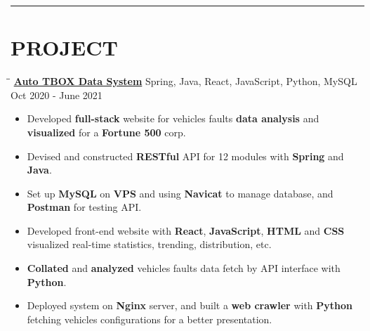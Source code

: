 \documentclass{res}
\begin{document}
\begin{resume}
\vspace{+0.05in}

\vspace{-8pt}
\hspace{-0.55in}
\noindent\rule[0.25\baselineskip]{19.36cm}{0.5pt}    
        
\vspace{-0.2in}
\section{PROJECT}

    \vspace{-0.05in}	 
    \begin{tabbing}
    \hspace{2.3in}\= \hspace{3.45in}\= \kill %
    \href{https://github.com/DolorHunter/AutoTBOXDataSystem}{\bf Auto TBOX Data System}  \> 
                Spring, Java, React, JavaScript, Python, MySQL \> 
				Oct 2020 - June 2021
				\\
    \end{tabbing}\vspace{-20pt}      %
    \vspace{+0.1in}
    \begin{itemize} \itemsep 1.5pt %
        \item Developed {\bf full-stack} website for vehicles faults {\bf data analysis} and
        {\bf visualized} for a {\bf Fortune 500} corp.
        \item Devised and constructed {\bf RESTful} API for 12 modules with 
                {\bf Spring} and {\bf Java}.
        \item Set up {\bf MySQL} on {\bf VPS} and using {\bf Navicat} to manage database, and 
                {\bf Postman} for testing API.
        \item Developed front-end website with {\bf React}, {\bf JavaScript}, {\bf HTML} and {\bf CSS} visualized real-time statistics,  
                trending, distribution, etc.
        \item {\bf Collated} and {\bf analyzed} vehicles faults data fetch by API interface with 
                {\bf Python}.
        \item Deployed system on {\bf Nginx} server, and built a {\bf web crawler} with {\bf Python} fetching vehicles configurations for 
                a better presentation.
    \end{itemize}

\end{resume}
\end{document}
